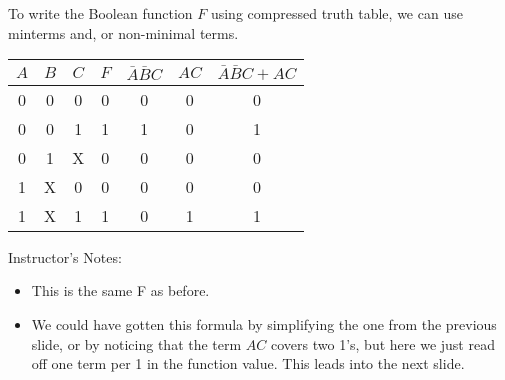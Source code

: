 \newpage
\begin{frame}[fragile]


 \begin{tcolorbox}[enhanced,attach boxed title to top center={yshift=-3mm,yshifttext=-1mm},
  colback=green!5!white,colframe=green!75!black,colbacktitle=green!80!black,
  title=Remember It,fonttitle=\bfseries,
  boxed title style={size=small,colframe=green!50!black} ]
  To write the Boolean function $F$  using compressed truth table, we can use minterms and, or non-minimal terms.
		\begin{center}
\begin{tabular}{ccc|c||cc|c}
$A$&$B$&$C$ & $F$ & $\bar A \bar B C $& $A C$ & $\bar A \bar B C + A C$ \\\hline
0&0&0 & 0 & 0 & 0 & 0 \\
0&0&1 & 1 & 1 & 0 & 1 \\
0&1&X & 0 & 0 & 0 & 0 \\
1&X&0 & 0 & 0 & 0 & 0 \\
1&X&1 & 1 & 0 & 1 & 1 \\
\end{tabular}
\end{center}
\end{tcolorbox}


\BNotes\ifnum{}
Instructor's Notes:
\begin{itemize}
\item This is the same F as before. 
\item We could have gotten this formula by
simplifying the one from the previous slide, or by noticing that the
term $AC$ covers two 1's, but here we just read off one term per 1 in
the function value. This leads into the next slide.
\end{itemize}
\fi\ENotes
\end{frame}




